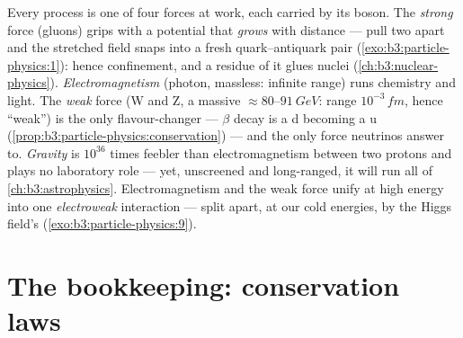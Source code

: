\begin{remark}\label{rem:b3:particle-physics:forces}
Every process is one of four forces at work, each carried by its
boson. The \emph{strong} force (gluons) grips  with a
potential that \emph{grows} with distance --- pull two 
apart and the stretched field snaps into a fresh
quark--antiquark pair (\cref{exo:b3:particle-physics:1}): hence
confinement, and a residue of it glues nuclei
(\cref{ch:b3:nuclear-physics}). \emph{Electromagnetism} (photon,
massless: infinite range) runs chemistry and light. The
\emph{weak} force (W and Z, a massive
$\approx80$--$\qty{91}{GeV}$: range $10^{-3}\,\unit{fm}$,
hence ``weak'') is the only flavour-changer --- $\beta$ decay is
a d  becoming a u
(\cref{prop:b3:particle-physics:conservation}) --- and the only
force neutrinos answer to. \emph{Gravity} is $10^{36}$ times
feebler than electromagnetism between two protons and plays no
laboratory role --- yet, unscreened and long-ranged, it will run
all of \cref{ch:b3:astrophysics}. Electromagnetism and the weak
force unify at high energy into one \emph{electroweak}
interaction --- split apart, at our cold energies, by the Higgs
field's  (\cref{exo:b3:particle-physics:9}).
\end{remark}

\section{The bookkeeping: conservation laws}

